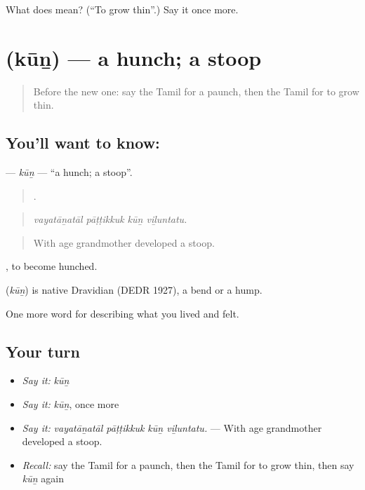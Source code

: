\begin{tcolorbox}[breakable,colback=teal!4,colframe=teal!35!black,title={Before you move on}]
What does  mean? (\textquotedblleft{}To grow thin\textquotedblright{}.) Say it once more.
\end{tcolorbox}
\section[\texorpdfstring{\ta{கூன்} (kūṉ)}{கூன் (kūṉ)}]{ (kūṉ) — a hunch; a stoop}

\label{lesson:TA-C488-kun}



\begin{quote}
Before the new one: say the Tamil for a paunch, then the Tamil for to grow thin.
\end{quote}

\subsection*{You'll want to know: }
\textbf{} — \emph{kūṉ} — \textquotedblleft{}a hunch; a stoop\textquotedblright{}.

\begin{quote}
   .
\end{quote}

\begin{quote}
\emph{vayatāṉatāl pāṭṭikkuk kūṉ viḻuntatu.}
\end{quote}

\begin{quote}
With age grandmother developed a stoop.
\end{quote}

 , to become hunched.

\begin{cousinweb}
\textbf{} (\emph{kūṉ}) is native Dravidian (DEDR 1927), a bend or a hump.
\end{cousinweb}

\begin{grammarlens}[title={What you've built}]
One more word for describing what you lived and felt.
\end{grammarlens}

\subsection*{Your turn}
\begin{itemize}
\raggedright
  \item \emph{Say it:} \emph{kūṉ}
  \item \emph{Say it:} \emph{kūṉ}, once more
  \item \emph{Say it:} \emph{vayatāṉatāl pāṭṭikkuk kūṉ viḻuntatu.} — With age grandmother developed a stoop.
  \item \emph{Recall:} say the Tamil for a paunch, then the Tamil for to grow thin, then say \emph{kūṉ} again
\end{itemize}

